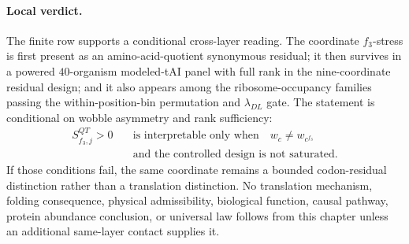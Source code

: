 \paragraph{Local verdict.}
The finite row supports a conditional cross-layer reading.  The coordinate $f_3$-stress is first present as an amino-acid-quotient synonymous residual; it then survives in a powered $40$-organism modeled-tAI panel with full rank in the nine-coordinate residual design; and it also appears among the ribosome-occupancy families passing the within-position-bin permutation and $\lambda_{DL}$ gate.  The statement is conditional on wobble asymmetry and rank sufficiency:
$$
\begin{aligned}
S^{QT}_{f_3,j} > 0
&\quad\text{is interpretable only when}\quad
w_c \ne w_{c^{f_3}}\\
&\quad\text{and the controlled design is not saturated.}
\end{aligned}
$$
If those conditions fail, the same coordinate remains a bounded codon-residual distinction rather than a translation distinction.  No translation mechanism, folding consequence, physical admissibility, biological function, causal pathway, protein abundance conclusion, or universal law follows from this chapter unless an additional same-layer contact supplies it.
